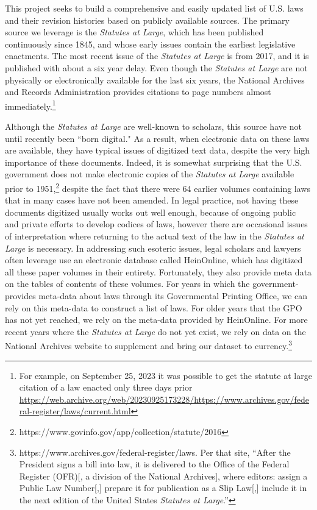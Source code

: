 \documentclass[fleqn,10pt]{wlscirep}
\begin{document}
This project seeks to build a comprehensive and easily updated list of U.S. laws and their revision histories based on publicly available sources. The primary source we leverage is the \emph{Statutes at Large}, which has been published continuously since 1845, and whose early issues contain the earliest legislative enactments. The most recent issue of the \emph{Statutes at Large} is from 2017, and it is published with about a six year delay. Even though the \emph{Statutes at Large} are not physically or electronically available for the last six years, the National Archives and Records Administration provides citations to page numbers almost immediately.\footnote{For example, on September 25, 2023 it was possible to get the statute at large citation of a law enacted only three days prior \url{https://web.archive.org/web/20230925173228/https://www.archives.gov/federal-register/laws/current.html}} 

Although the \emph{Statutes at Large} are well-known to scholars, this source have not until recently been ``born digital." As a result, when electronic data on these laws are available, they have typical issues of digitized text data, despite the very high importance of these documents. Indeed, it is somewhat surprising that the U.S. government does not make electronic copies of the \emph{Statutes at Large} available prior to 1951,\footnote{https://www.govinfo.gov/app/collection/statute/2016} despite the fact that there were 64 earlier volumes containing laws that in many cases have not been amended. In legal practice, not having these documents digitized usually works out well enough, because of ongoing public and private efforts to develop codices of laws, however there are occasional issues of interpretation where returning to the actual text of the law in the \emph{Statutes at Large} is necessary. In addressing such esoteric issues, legal scholars and lawyers often leverage use an electronic database called HeinOnline, which has digitized all these paper volumes in their entirety. Fortunately, they also provide meta data on the tables of contents of these volumes. For years in which the government-provides meta-data about laws through its Governmental Printing Office, we can rely on this meta-data to construct a list of laws. For older years that the GPO has not yet reached, we rely on the meta-data provided by HeinOnline. For more recent years where the \emph{Statutes at Large} do not yet exist, we rely on data on the National Archives website to supplement and bring our dataset to currency.\footnote{https://www.archives.gov/federal-register/laws. Per that site, ``After the President signs a bill into law, it is delivered to the Office of the Federal Register (OFR)[, a division of the National Archives], where editors: assign a Public Law Number[,] prepare it for publication as a Slip Law[,] include it in the next edition of the United States \emph{Statutes at Large}.''}
\end{document}

